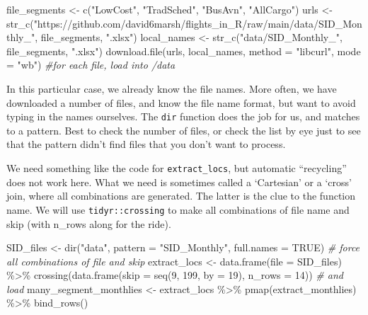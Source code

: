 \documentclass[
]{book}
\newenvironment{Shaded}{\begin{snugshade}}{\end{snugshade}}
\newcommand{\AttributeTok}[1]{\textcolor[rgb]{0.77,0.63,0.00}{#1}}
\newcommand{\CommentTok}[1]{\textcolor[rgb]{0.56,0.35,0.01}{\textit{#1}}}
\newcommand{\ConstantTok}[1]{\textcolor[rgb]{0.00,0.00,0.00}{#1}}
\newcommand{\DecValTok}[1]{\textcolor[rgb]{0.00,0.00,0.81}{#1}}
\newcommand{\FunctionTok}[1]{\textcolor[rgb]{0.00,0.00,0.00}{#1}}
\newcommand{\NormalTok}[1]{#1}
\newcommand{\OtherTok}[1]{\textcolor[rgb]{0.56,0.35,0.01}{#1}}
\newcommand{\SpecialCharTok}[1]{\textcolor[rgb]{0.00,0.00,0.00}{#1}}
\newcommand{\StringTok}[1]{\textcolor[rgb]{0.31,0.60,0.02}{#1}}
\begin{document}
\begin{Shaded}
\begin{Highlighting}[]
\NormalTok{file\_segments }\OtherTok{\textless{}{-}} \FunctionTok{c}\NormalTok{(}\StringTok{"LowCost"}\NormalTok{, }\StringTok{"TradSched"}\NormalTok{, }\StringTok{"BusAvn"}\NormalTok{, }\StringTok{"AllCargo"}\NormalTok{)}
\NormalTok{urls }\OtherTok{\textless{}{-}} \FunctionTok{str\_c}\NormalTok{(}\StringTok{"https://github.com/david6marsh/flights\_in\_R/raw/main/data/SID\_Monthly\_"}\NormalTok{,}
\NormalTok{                file\_segments, }
                \StringTok{".xlsx"}\NormalTok{)}
\NormalTok{local\_names }\OtherTok{\textless{}{-}} \FunctionTok{str\_c}\NormalTok{(}\StringTok{"data/SID\_Monthly\_"}\NormalTok{, file\_segments, }\StringTok{".xlsx"}\NormalTok{)}
\FunctionTok{download.file}\NormalTok{(urls, local\_names, }\AttributeTok{method =} \StringTok{"libcurl"}\NormalTok{, }\AttributeTok{mode =} \StringTok{"wb"}\NormalTok{) }\CommentTok{\#for each file, load into /data}
\end{Highlighting}
\end{Shaded}

In this particular case, we already know the file names. More often, we have downloaded a number of files, and know the file name format, but want to avoid typing in the names ourselves. The \texttt{dir} function does the job for us, and matches to a pattern. Best to check the number of files, or check the list by eye just to see that the pattern didn't find files that you don't want to process.

We need something like the code for \texttt{extract\_locs}, but automatic ``recycling'' does not work here. What we need is sometimes called a `Cartesian' or a `cross' join, where all combinations are generated. The latter is the clue to the function name. We will use \texttt{tidyr::crossing} to make all combinations of file name and skip (with n\_rows along for the ride).

\begin{Shaded}
\begin{Highlighting}[]
\NormalTok{SID\_files }\OtherTok{\textless{}{-}} \FunctionTok{dir}\NormalTok{(}\StringTok{"data"}\NormalTok{, }\AttributeTok{pattern =} \StringTok{"SID\_Monthly"}\NormalTok{, }\AttributeTok{full.names =} \ConstantTok{TRUE}\NormalTok{)}
\CommentTok{\# force all combinations of file and skip}
\NormalTok{extract\_locs }\OtherTok{\textless{}{-}} \FunctionTok{data.frame}\NormalTok{(}\AttributeTok{file =}\NormalTok{ SID\_files) }\SpecialCharTok{\%\textgreater{}\%} 
  \FunctionTok{crossing}\NormalTok{(}\FunctionTok{data.frame}\NormalTok{(}\AttributeTok{skip =} \FunctionTok{seq}\NormalTok{(}\DecValTok{9}\NormalTok{, }\DecValTok{199}\NormalTok{, }\AttributeTok{by =} \DecValTok{19}\NormalTok{),}
                       \AttributeTok{n\_rows =} \DecValTok{14}\NormalTok{))}
\CommentTok{\# and load}
\NormalTok{many\_segment\_monthlies }\OtherTok{\textless{}{-}}\NormalTok{ extract\_locs }\SpecialCharTok{\%\textgreater{}\%} 
  \FunctionTok{pmap}\NormalTok{(extract\_monthlies) }\SpecialCharTok{\%\textgreater{}\%} 
  \FunctionTok{bind\_rows}\NormalTok{()}
\end{Highlighting}
\end{Shaded}
\end{document}
